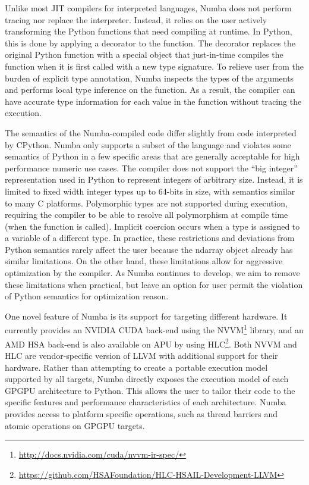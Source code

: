 \documentclass{sig-alternate}
\begin{document}
Unlike most JIT compilers for interpreted languages, Numba does not
perform tracing nor replace the interpreter.  Instead, it relies on
the user actively transforming the Python functions that need
compiling at runtime.  In Python, this is done by applying a decorator
to the function.  The decorator replaces the original Python function
with a special object that just-in-time compiles the function when it
is first called with a new type signature.  To relieve user from the
burden of explicit type annotation, Numba inspects the types of the
arguments and performs local type inference on the function.  As a
result, the compiler can have accurate type information for each value
in the function without tracing the execution.

The semantics of the Numba-compiled code differ slightly from code
interpreted by CPython. Numba only supports a subset of the language
and violates some semantics of Python in a few specific areas that are
generally acceptable for high performance numeric use cases.  The
compiler does not support the ``big integer'' representation used in
Python to represent integers of arbitrary size.  Instead, it is
limited to fixed width integer types up to 64-bits in size, with
semantics similar to many C platforms.  Polymorphic types are
not supported during execution, requiring the compiler to be able to
resolve all polymorphism at compile time (when the function is
called).  Implicit coercion occurs when a type is assigned to a
variable of a different type. In practice, these restrictions and
deviations from Python semantics rarely affect the user because the
ndarray object already has similar limitations. On the other hand,
these limitations allow for aggressive optimization by the compiler.
As Numba continues to develop, we aim to remove these limitations when
practical, but leave an option for user permit the violation of Python
semantics for optimization reason.

One novel feature of Numba is its support for targeting different
hardware.  It currently provides an NVIDIA CUDA\cite{CUDA} back-end using the
NVVM\footnote{\url{http://docs.nvidia.com/cuda/nvvm-ir-spec/}}
library, and an AMD HSA\cite{HSA} back-end is also available on APU by using
HLC\footnote{\url{https://github.com/HSAFoundation/HLC-HSAIL-Development-LLVM}}.
Both NVVM and HLC are vendor-specific version of LLVM with additional
support for their hardware.  Rather than attempting to create a portable
execution model supported by all targets, Numba directly exposes the
execution model of each GPGPU architecture to Python.  This allows the
user to tailor their code to the specific features and performance
characteristics of each architecture.  Numba provides access to
platform specific operations, such as thread barriers and atomic
operations on GPGPU targets.
\end{document}
